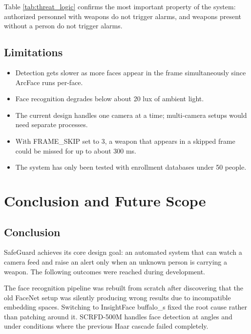 \documentclass[12pt,a4paper]{report}
\begin{document}
Table \ref{tab:threat_logic} confirms the most important property of the system: authorized personnel with weapons do not trigger alarms, and weapons present without a person do not trigger alarms.

\section{Limitations}

\begin{itemize}
    \item Detection gets slower as more faces appear in the frame simultaneously since ArcFace runs per-face.
    \item Face recognition degrades below about 20 lux of ambient light.
    \item The current design handles one camera at a time; multi-camera setups would need separate processes.
    \item With FRAME\_SKIP set to 3, a weapon that appears in a skipped frame could be missed for up to about 300 ms.
    \item The system has only been tested with enrollment databases under 50 people.
\end{itemize}


\chapter{Conclusion and Future Scope}

\section{Conclusion}

SafeGuard achieves its core design goal: an automated system that can watch a camera feed and raise an alert only when an unknown person is carrying a weapon. The following outcomes were reached during development.

The face recognition pipeline was rebuilt from scratch after discovering that the old FaceNet setup was silently producing wrong results due to incompatible embedding spaces. Switching to InsightFace buffalo\_s fixed the root cause rather than patching around it. SCRFD-500M handles face detection at angles and under conditions where the previous Haar cascade failed completely.
\end{document}
